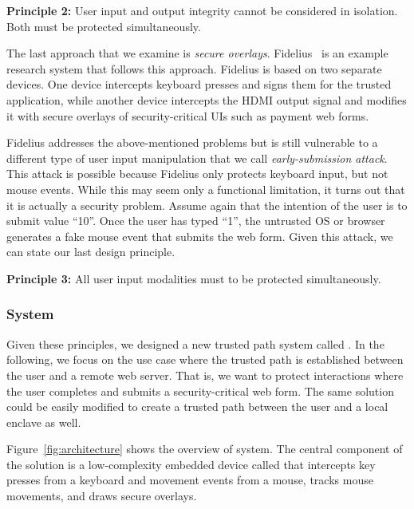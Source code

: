 \begin{tcolorbox}
\textbf{Principle 2:} User input and output integrity cannot be considered in isolation. Both must be protected simultaneously.
\end{tcolorbox}

The last approach that we examine is \emph{secure overlays}. Fidelius~\cite{Fidelius} is an example research system that follows this approach. Fidelius is based on two separate devices. One device intercepts keyboard presses and signs them for the trusted application, while another device intercepts the HDMI output signal and modifies it with secure overlays of security-critical UIs such as payment web forms. 

Fidelius addresses the above-mentioned problems but is still vulnerable to a different type of user input manipulation that we call \emph{early-submission attack}. This attack is possible because Fidelius only protects keyboard input, but not mouse events. While this may seem only a functional limitation, it turns out that it is actually a security problem. Assume again that the intention of the user is to submit value ``10''. Once the user has typed ``1'', the untrusted OS or browser generates a fake mouse event that submits the web form. Given this attack, we can state our last design principle.

\begin{tcolorbox}
\textbf{Principle 3:} All user input modalities must to be protected simultaneously.
\end{tcolorbox}


\subsubsection*{\protection System}

Given these principles, we designed a new trusted path system called \protection. In the following, we focus on the use case where the trusted path is established between the user and a remote web server. That is, we want to protect interactions where the user completes and submits a security-critical web form. The same solution could be easily modified to create a trusted path between the user and a local enclave as well.

Figure~\ref{fig:architecture} shows the overview of \protection system. The central component of the solution is a low-complexity embedded device called \hub that intercepts key presses from a keyboard and movement events from a mouse, tracks mouse movements, and draws secure overlays. 

